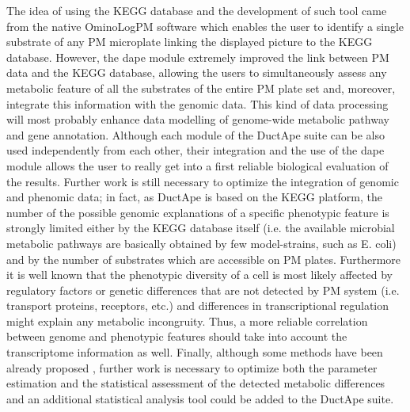 The idea of using the KEGG database and the development of such tool came from the native OminoLog\texttrademark PM software which enables the user to identify a single substrate of any PM microplate linking the displayed picture to the KEGG database. However, the dape module extremely improved the link between PM data and the KEGG database, allowing the users to simultaneously assess any metabolic feature of all the substrates of the entire PM plate set and, moreover, integrate this information with the genomic data. This kind of data processing will most probably enhance data modelling of genome-wide metabolic pathway and gene annotation.
Although each module of the DuctApe suite can be also used independently from each other, their integration and the use of the dape module allows the user to really get into a first reliable biological evaluation of the results. Further work is still necessary to optimize the integration of genomic and phenomic data; in fact, as DuctApe is based on the KEGG platform, the number of the possible genomic explanations of a specific phenotypic feature is strongly limited either by the KEGG database itself (i.e. the available microbial metabolic pathways are basically obtained by few model-strains, such as E. coli) and by the number of substrates which are accessible on PM plates. Furthermore it is well known that the phenotypic diversity of a cell is most likely affected by regulatory factors or genetic differences that are not detected by PM system (i.e. transport proteins, receptors, etc.) and differences in transcriptional regulation might explain any metabolic incongruity. Thus, a more reliable correlation between genome and phenotypic features should take into account the transcriptome information as well. Finally, although some methods have been already proposed \cite{vaas2012visualization}, further work is necessary to optimize both the parameter estimation and the statistical assessment of the detected metabolic differences and an additional statistical analysis tool could be added to the DuctApe suite.


\backmatter
{}
\renewcommand{\sectionmark}[1]{\markright{#1}}
\sectionmark{Bibliography}
